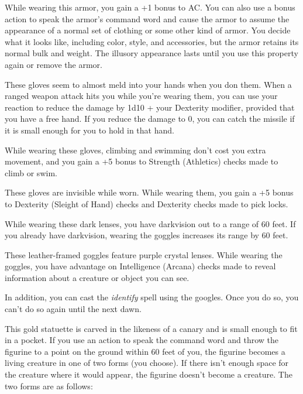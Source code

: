 \documentclass[10pt,a4paper,twoside,bg=print,twocolumn,openany,nodeprecatedcode]{dndbook}
\begin{document}
While wearing this armor, you gain a +1 bonus to AC. You can also use a bonus action to speak the armor's command word and cause the armor to assume the appearance of a normal set of clothing or some other kind of armor. You decide what it looks like, including color, style, and accessories, but the armor retains its normal bulk and weight. The illusory appearance lasts until you use this property again or remove the armor.

These gloves seem to almost meld into your hands when you don them. When a ranged weapon attack hits you while you're wearing them, you can use your reaction to reduce the damage by 1d10 + your Dexterity modifier, provided that you have a free hand. If you reduce the damage to 0, you can catch the missile if it is small enough for you to hold in that hand.

While wearing these gloves, climbing and swimming don't cost you extra movement, and you gain a +5 bonus to Strength (Athletics) checks made to climb or swim.

These gloves are invisible while worn. While wearing them, you gain a +5 bonus to Dexterity (Sleight of Hand) checks and Dexterity checks made to pick locks.

While wearing these dark lenses, you have darkvision out to a range of 60 feet. If you already have darkvision, wearing the goggles increases its range by 60 feet.

These leather-framed goggles feature purple crystal lenses. While wearing the goggles, you have advantage on Intelligence (Arcana) checks made to reveal information about a creature or object you can see.

In addition, you can cast the \textit{identify} spell using the googles. Once you do so, you can't do so again until the next dawn.

This gold statuette is carved in the likeness of a canary and is small enough to fit in a pocket. If you use an action to speak the command word and throw the figurine to a point on the ground within 60 feet of you, the figurine becomes a living creature in one of two forms (you choose). If there isn't enough space for the creature where it would appear, the figurine doesn't become a creature. The two forms are as follows:
\end{document}
